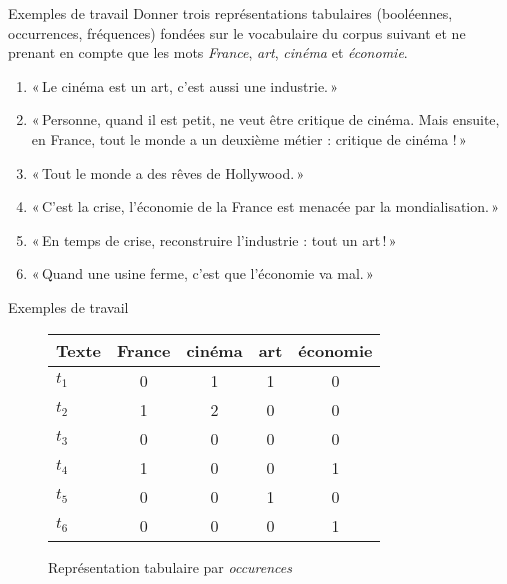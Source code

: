 \documentclass[../allslides.tex]{subfiles}
\begin{document}
\renewcommand\docdate{2021-02-18}  %



\begin{frame}{Exemples de travail}
	Donner trois représentations tabulaires (booléennes, occurrences, fréquences) fondées sur le vocabulaire du corpus suivant et ne prenant en compte que les mots \emph{France}, \emph{art}, \emph{cinéma} et \emph{économie}.
	\begin{enumerate}
		\item « Le cinéma est un art, c’est aussi une industrie. »
		\item « Personne, quand il est petit, ne veut être critique de cinéma. Mais ensuite, en France, tout le monde a un deuxième métier : critique de cinéma ! »
		\item « Tout le monde a des rêves de Hollywood. »
		\item « C’est la crise, l’économie de la France est menacée par la mondialisation. »
		\item « En temps de crise, reconstruire l’industrie : tout un art ! »
		\item « Quand une usine ferme, c’est que l’économie va mal. »
	\end{enumerate}
\end{frame}


\begin{frame}{Exemples de travail}
	\begin{figure}
		\caption{Représentation tabulaire par \emph{occurences}}
		\begin{tabular}{l*{4}{S}}
			\toprule
			\textbf{Texte} & {\textbf{France}} & {\textbf{cinéma}} & {\textbf{art}} & {\textbf{économie}}\\
			\midrule
			\(t_1\) & 0 & 1 & 1 & 0\\
			\(t_2\) & 1 & 2 & 0 & 0\\
			\(t_3\) & 0 & 0 & 0 & 0\\
			\(t_4\) & 1 & 0 & 0 & 1\\
			\(t_5\) & 0 & 0 & 1 & 0\\
			\(t_6\) & 0 & 0 & 0 & 1\\
			\hline
			\bottomrule
		\end{tabular}
	\end{figure}
\end{frame}
\end{document}
